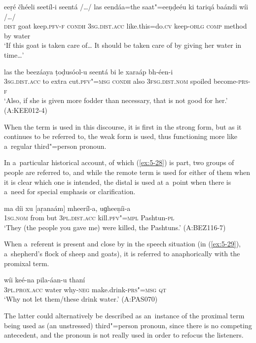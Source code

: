 \begin{exe}
\ex
\label{ex:5-27}
\gll eeṛé čhéeli seetíl-i seentá /{\ldots}/ las eendáa=the saat"=eeṇḍeéu ki
tariqá baándi wíi /{\ldots}/ \\
\textsc{dist} goat keep.\textsc{pfv-f} \textsc{condh} {} \textsc{3sg.dist.acc} like.this=do.\textsc{cv} keep-\textsc{oblg} \textsc{comp} method by water\\
\glt `If this goat is taken care of{\ldots} It should be taken care of by giving her water in time{\ldots}'

\gll las the beezáaya ṭoḍusóol-u seentá bi le xaraáp bh-éen-i \\
\textsc{3sg}.\textsc{dist.acc} to extra cut.\textsc{pfv"=msg} \textsc{condh} also
\textsc{3fsg}.\textsc{dist.nom} spoiled become-\textsc{prs-f} \\
\glt `Also, if she is given more fodder than necessary, that is not good for her.' (A:KEE012-4)
\end{exe}
When the term is used in this discourse, it is first in the strong form, but as it continues to be referred to, the weak form is used, thus functioning more like a~regular third"=person pronoun.

In a~particular historical account, of which (\ref{ex:5-28}) is part, two groups of people are referred to, and while the remote term is used for either of them when it is clear which one is intended, the distal is used at a~point when there is a~need for special emphasis or clarification.

\begin{exe}
\ex
\label{ex:5-28}
\gll ma díi xu [aṛanaám] mheeríl-a, uɡheeṇíi-a\\
\textsc{1sg}.\textsc{nom} from but \textsc{3pl.}\textsc{dist.acc} kill.\textsc{pfv"=mpl} Pashtun-\textsc{pl}\\
\glt `They (the people you gave me) were killed, the Pashtuns.' (A:BEZ116-7)\\
\end{exe}
When a~referent is present and close by in the speech situation (in (\ref{ex:5-29}), a~shepherd's flock of sheep and goats), it is referred to anaphorically with the promixal term.

\begin{exe}
\ex
\label{ex:5-29}
\gll [aniaám] wíi keé-na pila-áan-u thaní \\
\textsc{3pl.prox.acc} water why-\textsc{neg} make.drink-\textsc{prs"=msg} \textsc{qt}\\
\glt `Why not let them/these drink water.' (A:PAS070)
\end{exe}
The latter could alternatively be described as an~instance of the proximal term being used as (an unstressed) third"=person pronoun, since there is no competing antecedent, and the pronoun is not really used in order to refocus the listeners.


